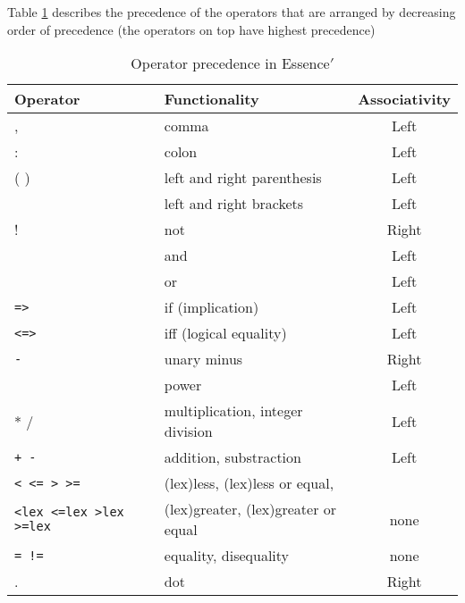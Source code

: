 \documentclass{article}
\begin{document}
Table \ref{tab:precedence} describes the precedence of the operators that 
are arranged by decreasing order of precedence (the operators on top have highest precedence)


\begin{table}


    
    \begin{center}
    \begin{tabular}{|l|lc|}
 
      \hline
       Operator & Functionality & Associativity \\
       \hline
       \hline
       ,   & comma & Left \\   
       \hline
       :   & colon & Left \\
       \hline
       ( ) & left and right parenthesis & Left \\
       \hline
       \verb1[ ]1 & left and right brackets & Left \\
       \hline
       ! & not & Right \\  
       \hline
       \verb1/\1 & and & Left \\ 
       \hline
       \verb1\/1 & or & Left \\ 
       \hline
        {\tt =>} & if (implication)  & Left \\ 
	\hline
        {\tt <=>} & iff (logical equality) & Left \\ 
	\hline
        {\tt -} & unary minus & Right \\
	\hline
        \verb1^1 & power & Left \\ 
	\hline
        * / & multiplication, integer division & Left \\ 
	\hline
        {\tt + -} & addition, substraction &  Left \\
	\hline
        {\tt < <= > >= } & (lex)less, (lex)less or equal, &  \\ 
	{\tt <lex <=lex >lex >=lex } & (lex)greater, (lex)greater or equal & none \\ 
	\hline
        {\tt = !=} & equality, disequality & none \\
	\hline
        . & dot & Right \\ 
	\hline

      \end{tabular}\label{tab:precedence}
\end{center}
    \caption{Operator precedence in {\sc Essence}$'$}


\end{table}
\end{document}
